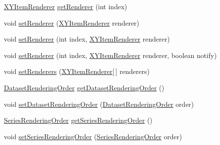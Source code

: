 \begin{DoxyCompactItemize}
\item 
\mbox{\hyperlink{interfaceorg_1_1jfree_1_1chart_1_1renderer_1_1xy_1_1_x_y_item_renderer}{X\+Y\+Item\+Renderer}} \mbox{\hyperlink{classorg_1_1jfree_1_1chart_1_1plot_1_1_x_y_plot_a53b99134a5298b4aad9e602210a54896}{get\+Renderer}} (int index)
\item 
void \mbox{\hyperlink{classorg_1_1jfree_1_1chart_1_1plot_1_1_x_y_plot_a7fd7dcb961248486bac19441a2e95eb7}{set\+Renderer}} (\mbox{\hyperlink{interfaceorg_1_1jfree_1_1chart_1_1renderer_1_1xy_1_1_x_y_item_renderer}{X\+Y\+Item\+Renderer}} renderer)
\item 
void \mbox{\hyperlink{classorg_1_1jfree_1_1chart_1_1plot_1_1_x_y_plot_a9168d5fc85bd04d15231042574e98285}{set\+Renderer}} (int index, \mbox{\hyperlink{interfaceorg_1_1jfree_1_1chart_1_1renderer_1_1xy_1_1_x_y_item_renderer}{X\+Y\+Item\+Renderer}} renderer)
\item 
void \mbox{\hyperlink{classorg_1_1jfree_1_1chart_1_1plot_1_1_x_y_plot_a7bfaa67a2524bc5d91afbd9a02ffff07}{set\+Renderer}} (int index, \mbox{\hyperlink{interfaceorg_1_1jfree_1_1chart_1_1renderer_1_1xy_1_1_x_y_item_renderer}{X\+Y\+Item\+Renderer}} renderer, boolean notify)
\item 
void \mbox{\hyperlink{classorg_1_1jfree_1_1chart_1_1plot_1_1_x_y_plot_ac7ee26bf014407831674163620650978}{set\+Renderers}} (\mbox{\hyperlink{interfaceorg_1_1jfree_1_1chart_1_1renderer_1_1xy_1_1_x_y_item_renderer}{X\+Y\+Item\+Renderer}}\mbox{[}$\,$\mbox{]} renderers)
\item 
\mbox{\hyperlink{classorg_1_1jfree_1_1chart_1_1plot_1_1_dataset_rendering_order}{Dataset\+Rendering\+Order}} \mbox{\hyperlink{classorg_1_1jfree_1_1chart_1_1plot_1_1_x_y_plot_a09cd7f85a32d373cbe5ceb73e90c86ed}{get\+Dataset\+Rendering\+Order}} ()
\item 
void \mbox{\hyperlink{classorg_1_1jfree_1_1chart_1_1plot_1_1_x_y_plot_ae1789cf50a68e21074c57a0bdc79c6c6}{set\+Dataset\+Rendering\+Order}} (\mbox{\hyperlink{classorg_1_1jfree_1_1chart_1_1plot_1_1_dataset_rendering_order}{Dataset\+Rendering\+Order}} order)
\item 
\mbox{\hyperlink{classorg_1_1jfree_1_1chart_1_1plot_1_1_series_rendering_order}{Series\+Rendering\+Order}} \mbox{\hyperlink{classorg_1_1jfree_1_1chart_1_1plot_1_1_x_y_plot_a1a743a03a79a8f5c1cc42bb245057e55}{get\+Series\+Rendering\+Order}} ()
\item 
void \mbox{\hyperlink{classorg_1_1jfree_1_1chart_1_1plot_1_1_x_y_plot_a4e8fd233186ffd56cf481ca55e1d6906}{set\+Series\+Rendering\+Order}} (\mbox{\hyperlink{classorg_1_1jfree_1_1chart_1_1plot_1_1_series_rendering_order}{Series\+Rendering\+Order}} order)

\end{DoxyCompactItemize}
